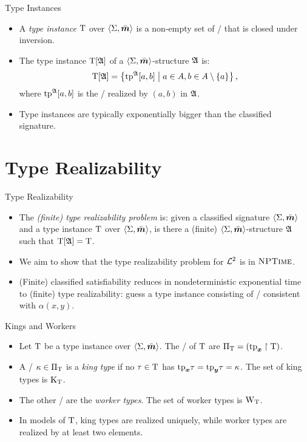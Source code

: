 \documentclass{beamer}
\begin{document}
\begin{frame}{Type Instances}
\begin{itemize}
\item A \emph{type instance} $\mathrm{T}$ over $\left\langle \Sigma,\bar{\bm{m}} \right\rangle$ is a non-empty set of
\twotypes/ that is closed under inversion.
\item The type instance $\mathrm{T}[\mathfrak{A}]$ of a $\left\langle \Sigma,\bar{\bm{m}} \right\rangle$-structure $\mathfrak{A}$
is:
\[
  \mathrm{T}[\mathfrak{A}] = \left\{\operatorname{tp}^{\mathfrak{A}}[a,b]\mathrel{}\middle|\mathrel{}a\in A,b\in A\setminus\left\{a\right\}\right\},
\]
where $\operatorname{tp}^{\mathfrak{A}}[a,b]$ is the \twotype/ realized by $(a,b)$ in $\mathfrak{A}$.
\item Type instances are typically exponentially bigger than the classified
signature.
\end{itemize}
\end{frame}

\section{Type Realizability}
\begin{frame}{Type Realizability}
\begin{itemize}
  \item 
  The \emph{(finite) type realizability problem} is: given a classified signature
  $\left\langle \Sigma,\bar{\bm{m}} \right\rangle$ and a type instance $\mathrm{T}$ over $\left\langle \Sigma,\bar{\bm{m}} \right\rangle$, is there a
  (finite) $\left\langle \Sigma,\bar{\bm{m}} \right\rangle$-structure $\mathfrak{A}$ such that $\mathrm{T}[\mathfrak{A}] = \mathrm{T}$.
  \item We aim to show that the type realizability problem for $\mathcal{L}^{2}$ is in
  $\text{\normalfont{\scshape NPTime}}$.
  \item (Finite) classified satisfiability reduces in nondeterministic
  exponential time to (finite) type realizability: guess a type instance consisting of
  \twotypes/ consistent with $\alpha(x,y)$.
\end{itemize}
\end{frame}

\begin{frame}{Kings and Workers}
\begin{itemize}
  \item 
  Let $\mathrm{T}$ be a type instance over $\left\langle \Sigma,\bar{\bm{m}} \right\rangle$.
  The \onetypes/ of $\mathrm{T}$ are ${\Pi}_{\mathrm{T}} = (\mathrm{tp}_{\bm{x}}\restriction\mathrm{T})$.
  \item
  A \onetype/ $\kappa\in {\Pi}_{\mathrm{T}}$ is a \emph{king type} if no $\tau\in\mathrm{T}$ has
  $\mathrm{tp}_{\bm{x}}\tau = \mathrm{tp}_{\bm{y}}\tau =\kappa$. The set of king types is ${\mathrm{K}}_{\mathrm{T}}$.
  \item
  The other \onetypes/ are the \emph{worker types}. The set of worker types is
  ${\mathrm{W}}_{\mathrm{T}}$.
  \item In models of $\mathrm{T}$, king types are realized uniquely, while worker types
  are realized by at least two elements.
\end{itemize}
\end{frame}
\end{document}
